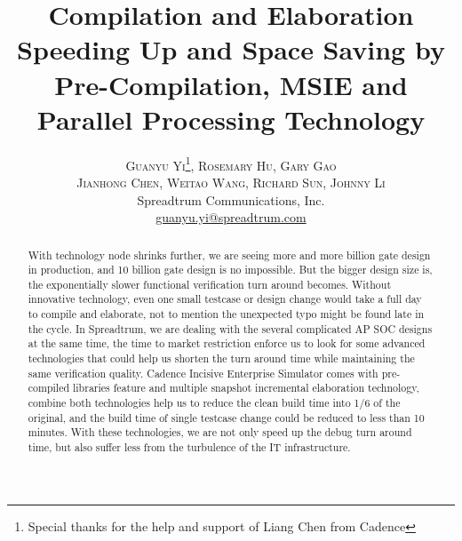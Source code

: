 \documentclass[twoside]{article}
\title{\vspace{-15mm}\fontsize{24pt}{10pt}\selectfont\textbf{Compilation and Elaboration Speeding Up and Space Saving by Pre-Compilation, MSIE and Parallel Processing Technology}} %
\author{
  \large
  \textsc{Guanyu Yi}\thanks{Special thanks for the help and support of Liang Chen from Cadence}, \textsc{Rosemary Hu}, \textsc{Gary Gao} \\[2mm]
  \textsc{Jianhong Chen}, \textsc{Weitao Wang}, \textsc{Richard Sun}, \textsc{Johnny Li} \\[2mm] %
  \normalsize Spreadtrum Communications, Inc. \\ %
  \normalsize \href{mailto:guanyu.yi@spreadtrum.com}{guanyu.yi@spreadtrum.com} %
  \vspace{-5mm}
}
\date{}
\begin{document}
\maketitle %
\thispagestyle{fancy} %


\begin{abstract}

  With technology node shrinks further, we are seeing more and more billion gate design in production, and 10 billion gate design is no impossible. But the bigger design size is, the exponentially slower functional verification turn around becomes. Without innovative technology, even one small testcase or design change would take a full day to compile and elaborate, not to mention the unexpected typo might be found late in the cycle. In Spreadtrum, we are dealing with the several complicated AP SOC designs at the same time, the time to market restriction enforce us to look for some advanced technologies that could help us shorten the turn around time while maintaining the same verification quality. Cadence Incisive Enterprise Simulator comes with pre-compiled libraries feature and multiple snapshot incremental elaboration technology, combine both technologies help us to reduce the clean build time into 1/6 of the original, and the build time of single testcase change could be reduced to less than 10 minutes. With these technologies, we are not only speed up the debug turn around time, but also suffer less from the turbulence of the IT infrastructure.

\end{abstract}

\end{document}
